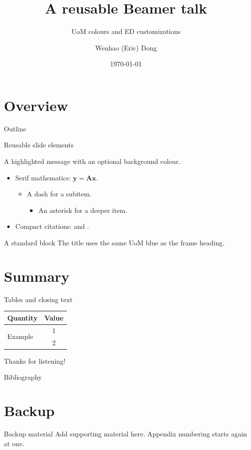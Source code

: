 \documentclass{beamer}
\author[Eric Dong]{Wenhao (Eric) Dong}
\title[Example talk]{A reusable Beamer talk}
\subtitle{UoM colours and ED customizations}
\institute{University of Melbourne \& OzGrav}
\date{\today}
\begin{document}
\begin{frame}
  \titlepage
\end{frame}

\section{Overview}
\miniframesoff
\begin{frame}[noframenumbering]{Outline}
  \tableofcontents
\end{frame}
\miniframeson

\begin{frame}{Reusable slide elements}
  \begin{myshadowbox}[colback=green!5]
    A highlighted message with an optional background colour.
  \end{myshadowbox}
  \begin{itemize}
    \item Serif mathematics: \(\bm{y}=\bm{A}\bm{x}\).
      \begin{itemize}
        \item A dash for a subitem.
          \begin{itemize}
            \item An asterisk for a deeper item.
          \end{itemize}
      \end{itemize}
    \item Compact citations: \citet{example} and \citep{example}.
  \end{itemize}
  \begin{block}{A standard block}
    The title uses the same UoM blue as the frame heading.
  \end{block}
\end{frame}

\section{Summary}
\begin{frame}{Tables and closing text}
  \centering
  \begin{tabular}{lc}
    \toprule
    Quantity & Value \\
    \midrule
    \multirow{2}{*}{Example} & 1 \\
    & 2 \\
    \bottomrule
  \end{tabular}
  \bigskip

  {\Large\calligra Thanks for listening!}
\end{frame}

\begin{frame}{Bibliography}
  \renewcommand*{\bibfont}{\tiny}
  \printbibliography
\end{frame}

\appendix
\section{Backup}
\begin{frame}{Backup material}
  Add supporting material here. Appendix numbering starts again at one.
\end{frame}
\end{document}
